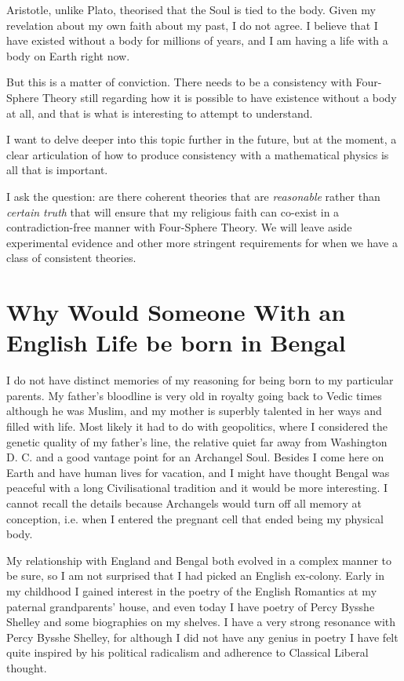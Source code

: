 \documentclass{amsart}
\begin{document}
Aristotle, unlike Plato, theorised that the Soul is tied to the body.  Given my revelation about my own faith about my past, I do not agree.  I believe that I have existed without a body for millions of years, and I am having a life with a body on Earth right now.  

But this is a matter of conviction.  There needs to be a consistency with Four-Sphere Theory still regarding how it is possible to have existence without a body at all, and that is what is interesting to attempt to understand.

I want to delve deeper into this topic further in the future, but at the moment, a clear articulation of how to produce consistency with a mathematical physics is all that is important.

I ask the question: are there coherent theories that are {\em reasonable} rather than {\em certain truth} that will ensure that my religious faith can co-exist in a contradiction-free manner with Four-Sphere Theory.  We will leave aside experimental evidence and other more stringent requirements for when we have a class of consistent theories.

\section{Why Would Someone With an English Life be born in Bengal}

I do not have distinct memories of my reasoning for being born to my particular parents.  My father's bloodline is very old in royalty going back to Vedic times although he was Muslim, and my mother is superbly talented in her ways and filled with life.  Most likely it had to do with geopolitics, where I considered the genetic quality of my father's line, the relative quiet far away from Washington D. C. and a good vantage point for an Archangel Soul.  Besides I come here on Earth and have human lives for vacation, and I might have thought Bengal was peaceful with a long Civilisational tradition and it would be more interesting.  I cannot recall the details because Archangels would turn off all memory at conception, i.e. when I entered the pregnant cell that ended being my physical body.

My relationship with England and Bengal both evolved in a complex manner to be sure, so I am not surprised that I had picked an English ex-colony.  Early in my childhood I gained interest in the poetry of the English Romantics at my paternal grandparents' house, and even today I have poetry of Percy Bysshe Shelley and some biographies on my shelves.  I have a very strong resonance with Percy Bysshe Shelley, for although I did not have any genius in poetry I have felt quite inspired by his political radicalism and adherence to Classical Liberal thought.  
\end{document}
